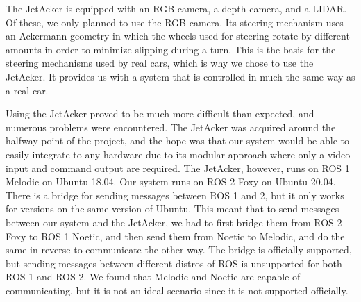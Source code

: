 \documentclass[titlepage,draft]{article}
\begin{document}
{The JetAcker is equipped with an RGB camera, a depth camera, and a LIDAR. Of these, we only planned to use the RGB camera. Its steering mechanism uses an Ackermann geometry in which the wheels used for steering rotate by different amounts in order to minimize slipping during a turn. This is the basis for the steering mechanisms used by real cars, which is why we chose to use the JetAcker. It provides us with a system that is controlled in much the same way as a real car.

Using the JetAcker proved to be much more difficult than expected, and numerous problems were encountered. The JetAcker was acquired around the halfway point of the project, and the hope was that our system would be able to easily integrate to any hardware due to its modular approach where only a video input and command output are required. The JetAcker, however, runs on ROS 1 Melodic on Ubuntu 18.04. Our system runs on ROS 2 Foxy on Ubuntu 20.04. There is a bridge for sending messages between ROS 1 and 2, but it only works for versions on the same version of Ubuntu. This meant that to send messages between our system and the JetAcker, we had to first bridge them from ROS 2 Foxy to ROS 1 Noetic, and then send them from Noetic to Melodic, and do the same in reverse to communicate the other way. The bridge is officially supported, but sending messages between different distros of ROS is unsupported for both ROS 1 and ROS 2. We found that Melodic and Noetic are capable of communicating, but it is not an ideal scenario since it is not supported officially.

}
\end{document}
